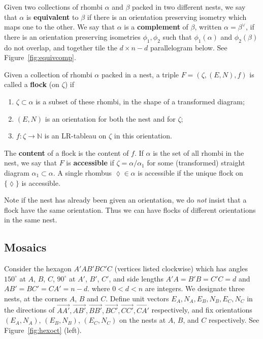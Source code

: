 \documentclass[12pt]{article}
\newcommand{\NN}{\mathbb{N}}
\begin{document}
Given two collections of rhombi $\alpha$ and $\beta$ packed in
two different nests, we say that $\alpha$ is {\bf equivalent}
to $\beta$ if there is an orientation preserving isometry which maps 
one to the other.  We say that $\alpha$ is a {\bf complement} of
$\beta$, written $\alpha = \beta^\vee$,  if there is an orientation 
preserving isometries $\phi_1, \phi_2$ such that $\phi_1(\alpha)$ and 
$\phi_2(\beta)$ 
do not overlap, and together tile the $d \times n{-}d$ parallelogram 
below.  See Figure~\ref{fig:equivcomp}.
\begin{center}
\end{center}

Given a collection of rhombi $\alpha$ packed in a nest, a triple
$F = (\zeta,(E,N),f)$ is called a {\bf flock} (on $\zeta$) if
\begin{enumerate}
\item[(i)] $\zeta \subset \alpha$ is a subset of these rhombi, in the 
shape of a transformed diagram;
\item[(ii)]
$(E,N)$ is an orientation for both the nest and for $\zeta$;
\item[(iii)] $f:\zeta \to \NN$ is an LR-tableau on $\zeta$ 
in this orientation.
\end{enumerate}
The {\bf content} of a flock is the content of $f$.
If $\alpha$ is the set of all rhombi in the nest, we say that $F$ is 
{\bf accessible} if $\zeta = \alpha/\alpha_1$ for 
some (transformed) straight diagram $\alpha_1 \subset \alpha$.  
A single rhombus $\lozenge \in \alpha$ is accessible if the unique 
flock on $\{\lozenge\}$ is accessible.

Note if the nest has already been given an orientation, we do {\em not}
insist
that a flock have the same orientation.  Thus we can have flocks
of different orientations in the same nest.




\subsection{Mosaics}
\label{sec:mosaics}
Consider the hexagon $A'AB'BC'C$ (vertices listed clockwise) which has 
angles $150^\circ$ at $A$, $B$, $C$,
$90^\circ$ at $A'$, $B'$, $C'$, and side lengths
$A'A = B'B = C'C = d$ and $AB' = BC' = CA' = n-d$.
where $0 < d < n$ are integers.  We designate three nests,
at the corners $A$, $B$ and $C$.  Define unit vectors
$E_A, N_A, E_B, N_B, E_C, N_C$ in the directions of 
$\overrightarrow{AA'}, \overrightarrow{AB'}, 
\overrightarrow{BB'}, \overrightarrow{BC'}, 
\overrightarrow{CC'}, \overrightarrow{CA'}$ respectively, and
fix orientations $(E_A, N_A)$, $(E_B, N_B)$, $(E_C, N_C)$ 
on the nests at $A$, $B$, and $C$ respectively.  See 
Figure~\ref{fig:hexoct} (left).
\end{document}
